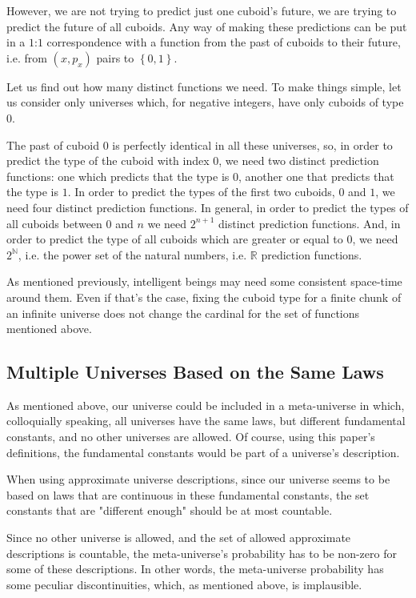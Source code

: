 \documentclass[a4paper
,draft
]{article}
\def\reale{\mathbb{R}}
\def\naturale{\mathbb{N}}
\newcommand{\multime}[1]{\left\{ #1 \right\}}
\begin{document}
However, we are not trying to predict just one cuboid's future,
we are trying to predict the future of all cuboids.
Any way of making these predictions can be put in a $1$:$1$ correspondence
with a function from the past
of cuboids to their future, i.e. from $(x, p_x)$ pairs to $\multime{0, 1}$.

Let us find out how many distinct functions we need.
To make things simple, let us consider only universes which, for negative
integers, have only cuboids of type $0$.

The past of cuboid $0$ is perfectly identical in all these universes, so,
in order to predict the type of the cuboid with index $0$,
we need two distinct prediction functions: one which predicts that the type is
$0$, another one that predicts that the type is $1$.
In order to predict the types of the first two cuboids, $0$ and $1$, we need
four distinct prediction functions.
In general, in order to predict the types of all cuboids between $0$ and $n$
we need $2^{n+1}$ distinct prediction functions.
And, in order to predict the type of all cuboids which are greater or equal
to $0$, we need $2^\naturale$, i.e. the power set of the natural numbers,
i.e. $\reale$ prediction functions.

As mentioned previously, intelligent beings may need some consistent space-time
around them. Even if that's the case, fixing the cuboid type for a finite
chunk of an infinite universe does not change the cardinal for the set of
functions mentioned above.

\subsection {Multiple Universes Based on the Same Laws}

As mentioned above, our universe could be included in a meta-universe in which,
colloquially speaking, all universes have the same laws,
but different fundamental constants, and no other universes are allowed.
Of course, using this paper's definitions,
the fundamental constants would be part of a universe's description.

When using approximate universe descriptions, since our universe
seems to be based on laws that are continuous in these fundamental constants,
the set constants that are "different enough" should be at most countable.

Since no other universe is allowed, and the set of allowed approximate
descriptions is countable, the meta-universe's probability
has to be non-zero for some of these descriptions. In other words, the
meta-universe probability has some peculiar discontinuities, which, as
mentioned above, is implausible.
\end{document}
